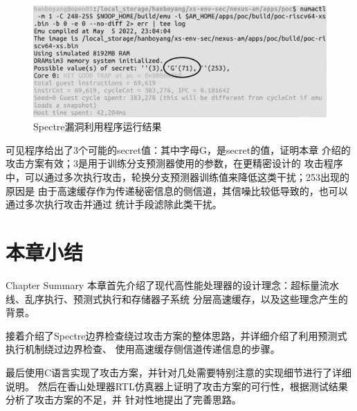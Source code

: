 \begin{figure}[ht]
	\centering
	\includegraphics[width=\textwidth]{figs/spectre-result.png}
	\caption{Spectre漏洞利用程序运行结果}
	\label{fig:spectre-result}
\end{figure}

可见程序给出了3个可能的secret值：其中字母G，是secret的值，证明本章
介绍的攻击方案有效；3是用于训练分支预测器使用的参数，在更精密设计的
攻击程序中，可以通过多次执行攻击，轮换分支预测器训练值来降低这类干扰；253出现的原因是
由于高速缓存作为传递秘密信息的侧信道，其信噪比较低导致的，也可以通过多次执行攻击并通过
统计手段滤除此类干扰。


\section{本章小结}{Chapter Summary}
本章首先介绍了现代高性能处理器的设计理念：超标量流水线、乱序执行、预测式执行和存储器子系统
分层高速缓存，以及这些理念产生的背景。

接着介绍了Spectre边界检查绕过攻击方案的整体思路，并详细介绍了利用预测式执行机制绕过边界检查、
使用高速缓存侧信道传递信息的步骤。

最后使用C语言实现了攻击方案，并针对几处需要特别注意的实现细节进行了详细说明。
然后在香山处理器RTL仿真器上证明了攻击方案的可行性，根据测试结果分析了攻击方案的不足，并
针对性地提出了完善思路。


\newpage
